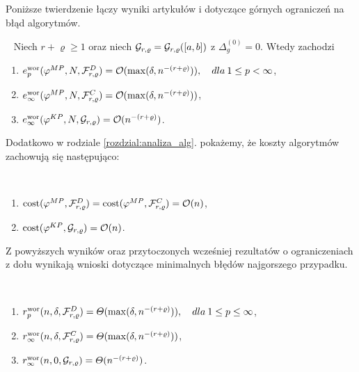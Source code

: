 \documentclass[oik, pdftex, man]{mgrwms}
\begin{document}
    Poniższe twierdzenie łączy wyniki artykułów \cite{CoDF} i \cite{AoP} dotyczące górnych ograniczeń na błąd algorytmów.
    
    \begin{thm} \label{thm:1:ograniczenia_z_gory}~%
        Niech $r+\varrho \geq 1$ oraz niech $\mathcal{G}_{r,\varrho} = \mathcal{G}_{r,\varrho}([a,b])$ z $\Delta_{g}^{(0)} = 0$. Wtedy zachodzi
        \begin{enumerate}[label=(\roman*)]
            \item \label{thm:1:i}$e_{p}^{\mathrm{wor}}(\varphi^{MP},N,\mathcal{F}_{r,\varrho}^{D}) = \mathcal{O}(\max(\delta, n^{-(r+\varrho)})), \quad dla \: 1 \leq p < \infty$,
            \item \label{thm:1:ii}$e_{\infty}^{\mathrm{wor}}(\varphi^{MP},N,\mathcal{F}_{r,\varrho}^{C}) = \mathcal{O}(\max(\delta, n^{-(r+\varrho)}))$,
            \item \label{thm:1:iii}$e_{\infty}^{\mathrm{wor}}(\varphi^{KP},N,\mathcal{G}_{r,\varrho}) = \mathcal{O}(n^{-(r+\varrho)})$.
        \end{enumerate}
    \end{thm}

    Dodatkowo w rodziale \ref{rozdzial:analiza_alg}. pokażemy, że koszty algorytmów zachowują się następująco:

    \begin{stw}~%
        \begin{enumerate}
            \item $\mathrm{cost}(\varphi^{MP}, \mathcal{F}_{r,\varrho}^{D}) = \mathrm{cost}(\varphi^{MP}, \mathcal{F}_{r,\varrho}^{C}) = \mathcal{O}(n)$,
            \item $\mathrm{cost}(\varphi^{KP}, \mathcal{G}_{r,\varrho}) = \mathcal{O}(n)$.
        \end{enumerate}
    \end{stw}

    Z powyższych wyników oraz przytoczonych wcześniej rezultatów o ograniczeniach z dołu wynikają wnioski dotyczące minimalnych błędów najgorszego przypadku.

    \begin{cor}~
        \begin{enumerate}[label=(\roman*)]
            \item $r^{\mathrm{wor}}_{p}(n, \delta, \mathcal{F}^{D}_{r,\varrho}) = \varTheta(\max(\delta, n^{-(r+\varrho)})), \quad dla \: 1 \leq p \leq \infty$,
            \item $r^{\mathrm{wor}}_{\infty}(n, \delta, \mathcal{F}^{C}_{r,\varrho}) = \varTheta(\max(\delta, n^{-(r+\varrho)}))$,
            \item $r^{\mathrm{wor}}_{\infty}(n, 0, \mathcal{G}_{r,\varrho}) = \varTheta(n^{-(r+\varrho)})$.
        \end{enumerate}
    \end{cor}
    
\end{document}
